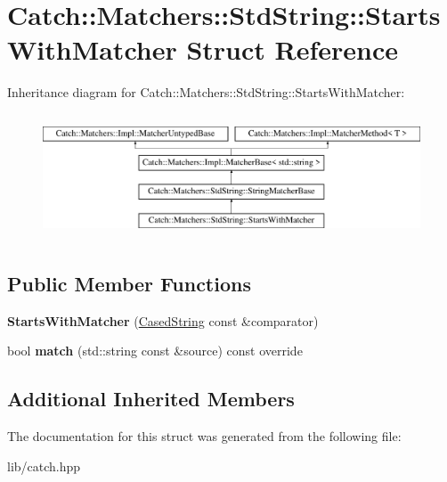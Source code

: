 \hypertarget{struct_catch_1_1_matchers_1_1_std_string_1_1_starts_with_matcher}{}\section{Catch\+:\+:Matchers\+:\+:Std\+String\+:\+:Starts\+With\+Matcher Struct Reference}
\label{struct_catch_1_1_matchers_1_1_std_string_1_1_starts_with_matcher}
Inheritance diagram for Catch\+:\+:Matchers\+:\+:Std\+String\+:\+:Starts\+With\+Matcher\+:\begin{figure}[H]
\begin{center}
\leavevmode
\includegraphics[height=3.758389cm]{struct_catch_1_1_matchers_1_1_std_string_1_1_starts_with_matcher}
\end{center}
\end{figure}
\subsection*{Public Member Functions}
\begin{DoxyCompactItemize}
\item 
\mbox{\label{struct_catch_1_1_matchers_1_1_std_string_1_1_starts_with_matcher_a7b86f258bdbd131a6e7bcd94a8977325}} 
{\bfseries Starts\+With\+Matcher} (\mbox{\hyperlink{struct_catch_1_1_matchers_1_1_std_string_1_1_cased_string}{Cased\+String}} const \&comparator)
\item 
\mbox{\label{struct_catch_1_1_matchers_1_1_std_string_1_1_starts_with_matcher_a7da4747aed0c48989d8be59a89e2b7fb}} 
bool {\bfseries match} (std\+::string const \&source) const override
\end{DoxyCompactItemize}
\subsection*{Additional Inherited Members}


The documentation for this struct was generated from the following file\+:\begin{DoxyCompactItemize}
\item 
lib/catch.\+hpp\end{DoxyCompactItemize}
